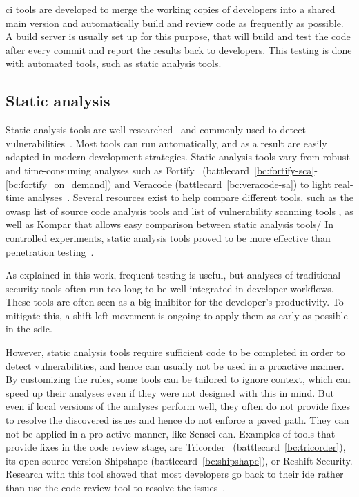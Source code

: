\Gls{ci} tools are developed to merge the working copies of developers into a shared main version and automatically build and review code as frequently as possible.
A build server is usually set up for this purpose, that will build and test the code after every commit and report the results back to developers.
This testing is done with automated tools, such as static analysis tools.

\subsection{Static analysis}
Static analysis tools are well researched~\cite{li2017static,jovanovic2006pixy,livshits2005finding} and commonly used to detect vulnerabilities~\cite{cruzes2017security,bsimm9,bsimm11}.
Most tools can run automatically, and as a result are easily adapted in modern development strategies.
Static analysis tools vary from robust and time-consuming analyses such as Fortify~\cite{chess2004static} (battlecard~\ref{bc:fortify-sca}-\ref{bc:fortify_on_demand}) and Veracode (battlecard~\ref{bc:veracode-sa}) to light real-time analyses~\cite{brown2016build}.
Several resources exist to help compare different tools, such as the \gls{owasp} list of source code analysis tools  and list of vulnerability scanning tools , as well as Kompar that allows easy comparison between static analysis tools/
In controlled experiments, static analysis tools proved to be more effective than penetration testing~\cite{Scandariato2013}.

As explained in this work, frequent testing is useful, but analyses of traditional security tools often run too long to be well-integrated in developer workflows.
These tools are often seen as a big inhibitor for the developer's productivity.
To mitigate this, a shift left movement is ongoing to apply them as early as possible in the \gls{sdlc}.

However, static analysis tools require sufficient code to be completed in order to detect vulnerabilities, and hence can usually not be used in a proactive manner.
By customizing the rules, some tools can be tailored to ignore context, which can speed up their analyses even if they were not designed with this in mind.
But even if local versions of the analyses perform well, they often do not provide fixes to resolve the discovered issues and hence do not enforce a paved path.
They can not be applied in a pro-active manner, like Sensei can.
Examples of tools that provide fixes in the code review stage, are Tricorder~\cite{sadowski2015tricorder} (battlecard~\ref{bc:tricorder}), its open-source version Shipshape (battlecard~\ref{bc:shipshape}), or Reshift Security.
Research with this tool showed that most developers go back to their \gls{ide} rather than use the code review tool to resolve the issues~\cite{sadowski2015tricorder}.

